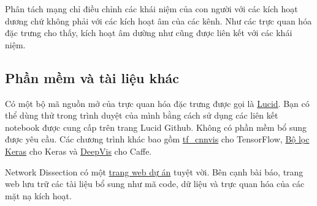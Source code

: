 Phân tách mạng chỉ điều chỉnh các khái niệm của con người với các kích hoạt dương chứ không phải với các kích hoạt âm của các kênh. Như các trực quan hóa đặc trưng  cho thấy, kích hoạt âm dường như cũng được liên kết với các khái niệm.

\subsection{Phần mềm và tài liệu khác}
Có một bộ mã nguồn mở của trực quan hóa đặc trưng được gọi là \href{https://github.com/tensorflow/lucid}{Lucid}. Bạn có thể dùng thử trong trình duyệt của mình bằng cách sử dụng các liên kết notebook được cung cấp trên trang Lucid Github. Không có phần mềm bổ sung được yêu cầu. Các chương trình khác bao gồm \href{https://github.com/InFoCusp/tf_cnnvis}{tf\_cnnvis} cho TensorFlow, \href{https://github.com/jacobgil/keras-filter-visualization}{Bộ lọc Keras} cho Keras và \href{https://github.com/yosinski/deep-visualization-toolbox}{DeepVis} cho Caffe.

Network Dissection có một \href{http://netdissect.csail.mit.edu/}{trang web dự án} tuyệt vời. Bên cạnh bài báo, trang web lưu trữ các tài liệu bổ sung như mã code, dữ liệu và trực quan hóa của các mặt nạ kích hoạt.
